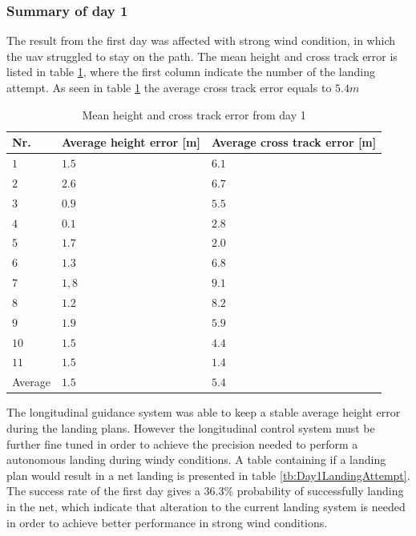 \subsubsection{Summary of day 1}\label{sss:summaryDay1}
The result from the first day was affected with strong wind condition, in which the \gls{uav} struggled to stay on the path. The mean height and cross track error is listed in table \ref{tb:Day1HeightCrossTrack}, where the first column indicate the number of the landing attempt. As seen in table \ref{tb:Day1HeightCrossTrack} the average cross track error equals to $5.4 m$
\begin{table}[H]
\centering
\begin{tabular}{| l | l | l |}
\hline
\textbf{Nr.} 	& \textbf{Average height error [m]} 	& \textbf{Average cross track error [m]}  \\ \hline
$1$				& $1.5$							& $6.1$								\\ \hline
$2$				& $2.6$							& $6.7$								\\ \hline
$3$				& $0.9$							& $5.5$								\\ \hline
$4$				& $0.1$							& $2.8$								\\ \hline
$5$				& $1.7$							& $2.0$								\\ \hline
$6$				& $1.3$							& $6.8$								\\ \hline
$7$				& $1,8$							& $9.1$								\\ \hline
$8$				& $1.2$							& $8.2$								\\ \hline
$9$				& $1.9$							& $5.9$								\\ \hline
$10$			& $1.5$							& $4.4$								\\ \hline
$11$			& $1.5$							& $1.4$								\\ \hline
Average				& $1.5$							& $5.4$								\\ \hline
\end{tabular}
\caption{Mean height and cross track error from day 1}
\label{tb:Day1HeightCrossTrack}
\end{table}
The longitudinal guidance system was able to keep a stable average height error during the landing plans. However the longitudinal control system must be further fine tuned in order to achieve the precision needed to perform a autonomous landing during windy conditions. A table containing if a landing plan would result in a net landing is presented in table \ref{tb:Day1LandingAttempt}. The success rate of the first day gives a $36.3  \% $ probability of successfully landing in the net, which indicate that alteration to the current landing system is needed in order to achieve better performance in strong wind conditions.
